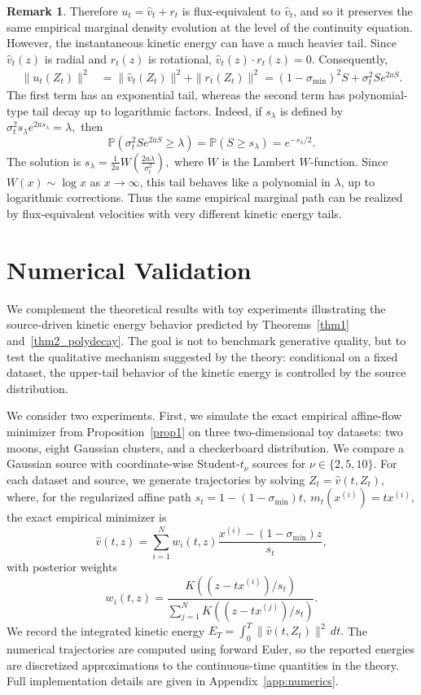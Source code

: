 \documentclass[a4paper,11pt]{article}
\theoremstyle{plain}
\theoremstyle{definition}
\newtheorem{remark}{Remark}[section]
\begin{document}
\begin{remark}
Therefore \(u_t=\hat v_t+r_t\) is flux-equivalent to \(\hat v_t\), and so it
preserves the same empirical marginal density evolution at the level of the
continuity equation. However, the instantaneous kinetic energy can have a much
heavier tail. Since \(\hat v_t(z)\) is radial and \(r_t(z)\) is rotational,
\(
    \hat v_t(z)\cdot r_t(z)=0.
\)
Consequently,
\[
\begin{aligned}
    \|u_t(Z_t)\|^2
    &=
    \|\hat v_t(Z_t)\|^2+\|r_t(Z_t)\|^2 =
    (1-\sigma_{\min})^2S
    +
    \sigma_t^2 S e^{2aS}.
\end{aligned}
\]
The first term has an exponential tail, whereas the second term has
polynomial-type tail decay up to logarithmic factors. Indeed, if \(s_\lambda\)
is defined by
\(
    \sigma_t^2 s_\lambda e^{2a s_\lambda}=\lambda,
\)
then
\[
    \mathbb P\!\left(\sigma_t^2 S e^{2aS}\ge \lambda\right)
    =
    \mathbb P(S\ge s_\lambda)
    =
    e^{-s_\lambda/2}.
\]
The solution is
\(
    s_\lambda
    =
    \frac{1}{2a}
    W\!\left(\frac{2a\lambda}{\sigma_t^2}\right),
\)
where \(W\) is the Lambert \(W\)-function. Since \(W(x)\sim\log x\) as
\(x\to\infty\), this tail behaves like a polynomial in \(\lambda\), up to
logarithmic corrections. Thus the same empirical marginal path can be realized
by flux-equivalent velocities with very different kinetic energy tails.
\end{remark}


\section{Numerical Validation}
\label{sec:numerics}

We complement the theoretical results with toy  experiments illustrating the source-driven
kinetic energy behavior predicted by Theorems~\ref{thm1} and~\ref{thm2_polydecay}. The goal is
not to benchmark generative quality, but to test the qualitative mechanism suggested by the
theory: conditional on a fixed dataset, the upper-tail behavior of the kinetic energy is
controlled by the source distribution.

We consider two experiments. First, we simulate the exact empirical affine-flow minimizer from
Proposition~\ref{prop1} on three two-dimensional toy datasets: two moons, eight Gaussian
clusters, and a checkerboard distribution. We compare a Gaussian source with coordinate-wise
Student-\(t_\nu\) sources for \(\nu\in\{2,5,10\}\). For each dataset and source, we generate
trajectories by solving
$\dot Z_t = \hat v(t,Z_t),$
where, for the regularized affine path
\(
    s_t=1-(1-\sigma_{\min})t, \ 
    m_t(x^{(i)})=t x^{(i)},
\)
the exact empirical minimizer is
\[
    \hat v(t,z)
    =
    \sum_{i=1}^N w_i(t,z)
    \frac{x^{(i)}-(1-\sigma_{\min})z}{s_t},
\]
with posterior weights
\[
    w_i(t,z)
    =
    \frac{
    K\!\left((z-tx^{(i)})/s_t\right)
    }{
    \sum_{j=1}^N
    K\!\left((z-tx^{(j)})/s_t\right)
    }.
\]
We record the integrated kinetic energy
$E_T
    =
    \int_0^T
    \|\hat v(t,Z_t)\|^2\,dt.$
The numerical trajectories are computed using forward Euler, so the reported energies are
discretized approximations to the continuous-time quantities in the theory. Full implementation
details are given in Appendix~\ref{app:numerics}. 
\end{document}
